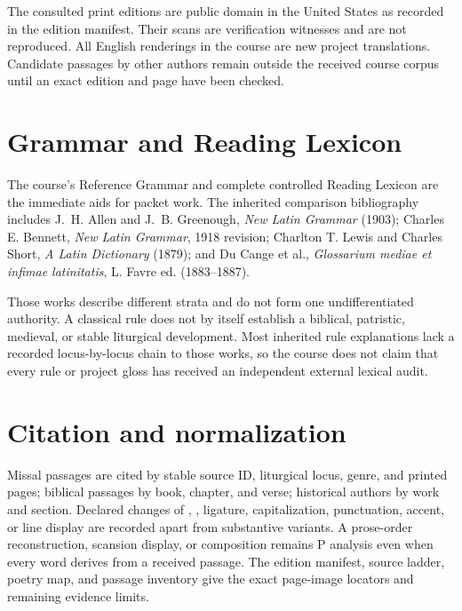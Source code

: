 The consulted print editions are public domain in the United States as
recorded in the edition manifest. Their scans are verification witnesses and
are not reproduced. All English renderings in the course are new project
translations. Candidate passages by other authors remain outside the received
course corpus until an exact edition and page have been checked.

\section{Grammar and Reading Lexicon}

The course's Reference Grammar and complete controlled Reading Lexicon are the
immediate aids for packet work. The inherited comparison bibliography includes
J.~H. Allen and J.~B. Greenough, \textit{New Latin Grammar} (1903); Charles
E. Bennett, \textit{New Latin Grammar}, 1918 revision; Charlton T. Lewis and
Charles Short, \textit{A Latin Dictionary} (1879); and Du Cange et al.,
\textit{Glossarium mediae et infimae latinitatis}, L. Favre ed.
(1883--1887).

Those works describe different strata and do not form one undifferentiated
authority. A classical rule does not by itself establish a biblical,
patristic, medieval, or stable liturgical development. Most inherited rule
explanations lack a recorded locus-by-locus chain to those works, so the course
does not claim that every rule or project gloss has received an independent
external lexical audit.

\section{Citation and normalization}

Missal passages are cited by stable source ID, liturgical locus, genre, and
printed pages; biblical passages by book, chapter, and verse; historical
authors by work and section. Declared changes of , ,
ligature, capitalization, punctuation, accent, or line display are recorded
apart from substantive variants. A prose-order reconstruction, scansion
display, or composition remains P analysis even when every word derives from a
received passage. The edition manifest, source ladder, poetry map, and passage
inventory give the exact page-image locators and remaining evidence limits.
